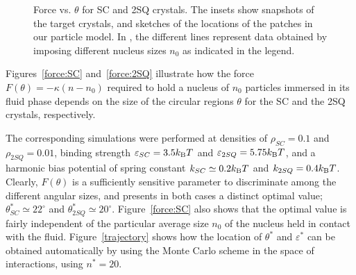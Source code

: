 \begin{figure}
\begin{center}
	\end{center}
	\caption[Force vs. $\theta$ for square cubic and 2D square crystals]{Force vs. $\theta$ for  SC and  2SQ crystals.  The insets show snapshots of the target crystals, and  sketches of the locations of the patches in our particle model. In
, the different lines represent data obtained by imposing different nucleus sizes $n_0$ as indicated
in the legend.}\label{fig:force}
\end{figure}

Figures~\ref{force:SC} and~\ref{force:2SQ} illustrate how the force $F(\theta)=-\kappa (n-n_0)$ required to hold a nucleus of $n_0$ particles immersed in its fluid phase depends on the size of the circular regions $\theta$ for the SC  and the 2SQ crystals, respectively.

The corresponding simulations were performed at densities of $\rho_{SC} = 0.1$ and $\rho_{2SQ} = 0.01$, binding strength $\varepsilon_{SC}=3.5k_{\rm B}T$ and $\varepsilon_{2SQ} = 5.75k_{\rm B}T$, and a harmonic bias potential of spring constant \textcolor{black}{$k_{SC} \simeq 0.2k_{\rm B}T$} and \textcolor{black}{$k_{2SQ} = 0.4 k_{\rm B}T$}.
Clearly, $F(\theta)$ is a sufficiently sensitive parameter to discriminate among the different angular sizes,  and presents in both cases a distinct optimal value; $\theta^*_{SC}\simeq 22^{\circ}$ and $\theta^*_{2SQ}\simeq 20^{\circ}$.
Figure~\ref{force:SC} also shows that the optimal value is fairly independent of  the particular average size 
$n_0$ of the nucleus held in contact with the fluid.
Figure~\ref{trajectory} shows how the location of $\theta^*$ and $\varepsilon^*$ can be obtained automatically by using the Monte Carlo scheme in the space of interactions, using $n^* = 20$.


